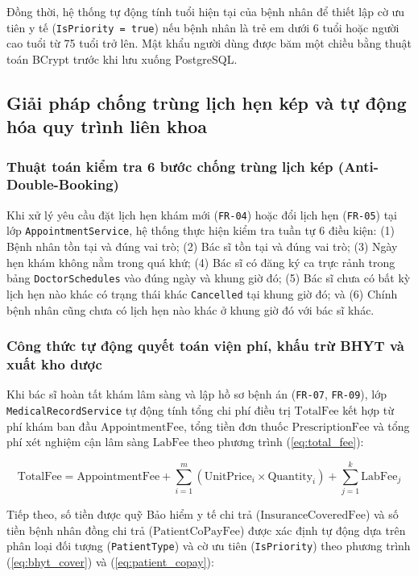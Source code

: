 Đồng thời, hệ thống tự động tính tuổi hiện tại của bệnh nhân để thiết lập cờ ưu tiên y tế (\texttt{IsPriority = true}) nếu bệnh nhân là trẻ em dưới 6 tuổi hoặc người cao tuổi từ 75 tuổi trở lên. Mật khẩu người dùng được băm một chiều bằng thuật toán BCrypt trước khi lưu xuống PostgreSQL.

\subsection{Giải pháp chống trùng lịch hẹn kép và tự động hóa quy trình liên khoa}

\subsubsection{Thuật toán kiểm tra 6 bước chống trùng lịch kép (Anti-Double-Booking)}

Khi xử lý yêu cầu đặt lịch hẹn khám mới (\texttt{FR-04}) hoặc đổi lịch hẹn (\texttt{FR-05}) tại lớp \texttt{AppointmentService}, hệ thống thực hiện kiểm tra tuần tự 6 điều kiện: (1) Bệnh nhân tồn tại và đúng vai trò; (2) Bác sĩ tồn tại và đúng vai trò; (3) Ngày hẹn khám không nằm trong quá khứ; (4) Bác sĩ có đăng ký ca trực rảnh trong bảng \texttt{DoctorSchedules} vào đúng ngày và khung giờ đó; (5) Bác sĩ chưa có bất kỳ lịch hẹn nào khác có trạng thái khác \texttt{Cancelled} tại khung giờ đó; và (6) Chính bệnh nhân cũng chưa có lịch hẹn nào khác ở khung giờ đó với bác sĩ khác.

\subsubsection{Công thức tự động quyết toán viện phí, khấu trừ BHYT và xuất kho dược}

Khi bác sĩ hoàn tất khám lâm sàng và lập hồ sơ bệnh án (\texttt{FR-07}, \texttt{FR-09}), lớp \texttt{MedicalRecordService} tự động tính tổng chi phí điều trị $\text{TotalFee}$ kết hợp từ phí khám ban đầu $\text{AppointmentFee}$, tổng tiền đơn thuốc $\text{PrescriptionFee}$ và tổng phí xét nghiệm cận lâm sàng $\text{LabFee}$ theo phương trình (\ref{eq:total_fee}):

\begin{equation}
\label{eq:total_fee}
\text{TotalFee} = \text{AppointmentFee} + \sum_{i=1}^{m} \left( \text{UnitPrice}_i \times \text{Quantity}_i \right) + \sum_{j=1}^{k} \text{LabFee}_j
\end{equation}

Tiếp theo, số tiền được quỹ Bảo hiểm y tế chi trả ($\text{InsuranceCoveredFee}$) và số tiền bệnh nhân đồng chi trả ($\text{PatientCoPayFee}$) được xác định tự động dựa trên phân loại đối tượng (\texttt{PatientType}) và cờ ưu tiên (\texttt{IsPriority}) theo phương trình (\ref{eq:bhyt_cover}) và (\ref{eq:patient_copay}):

